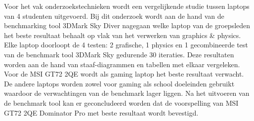 Voor het vak onderzoekstechnieken wordt een vergelijkende studie tussen laptops van 4 studenten uitgevoerd. Bij dit onderzoek wordt aan de hand van de benchmarking tool 3DMark Sky Diver nagegaan welke laptop van de groepsleden het beste resultaat behaalt
 op vlak van het verwerken van graphics \& physics. Elke laptop doorloopt de 4 testen: 2 grafische, 1 physics en 1 gecombineerde test van de benchmark tool 3DMark Sky gedurende 30 iteraties. Deze resultaten worden aan de hand van staaf-diagrammen en tabellen met elkaar vergeleken.
Voor de MSI GT72 2QE wordt als gaming laptop het beste resultaat verwacht. De andere laptops worden zowel voor gaming als school doeleinden gebruikt waardoor de verwachtingen van de benchmark lager liggen. Na het uitvoeren van de benchmark tool kan er geconcludeerd worden dat de voorspelling van MSI GT72 2QE Dominator Pro met beste resultaat wordt bevestigd. 
